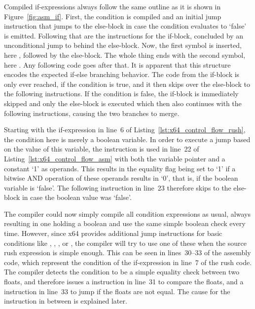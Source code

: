 Compiled if-expressions always follow the same outline as it is shown in Figure~\ref{fig:asm_if}.
First, the condition is compiled and an initial jump instruction that jumps to the else-block in case the condition evaluates to `false' is emitted.
Following that are the instructions for the if-block, concluded by an unconditional jump to behind the else-block.
Now, the first symbol is inserted, here , followed by the else-block.
The whole thing ends with the second symbol, here .
Any following code goes after that.
It is apparent that this structure encodes the expected if-else branching behavior.
The code from the if-block is only ever reached, if the condition is true, and it then skips over the else-block to the following instructions.
If the condition is false, the if-block is immediately skipped and only the else-block is executed which then also continues with the following instructions, causing the two branches to merge.

Starting with the if-expression in line~6 of Listing~\ref{lst:x64_control_flow_rush}, the condition here is merely a boolean variable.
In order to execute a jump based on the value of this variable, the  instruction is used in line~22 of Listing~\ref{lst:x64_control_flow_asm} with both the variable pointer and a constant `1' as operands.
This results in the equality flag being set to `1' if a bitwise AND operation of these operands results in `0', that is, if the boolean variable is `false'.
The following  instruction in line~23 therefore skips to the else-block in case the boolean value was `false'.

The compiler could now simply compile all condition expressions as usual, always resulting in one  holding a boolean and use the same simple boolean check every time.
However, since x64 provides additional jump instructions for basic conditions like \qVerb{==}, \qVerb{!=}, \qVerb{>=}, or \qVerb{<}, the compiler will try to use one of these when the source rush expression is simple enough.
This can be seen in lines~30--33 of the assembly code, which represent the condition of the if-expression in line~7 of the rush code.
The compiler detects the condition to be a simple equality check between two floats, and therefore issues a  instruction in line~31 to compare the floats, and a  instruction in line~33 to jump if the floats are not equal.
The cause for the \label{x64_ucomisd} instruction in between is explained later.

